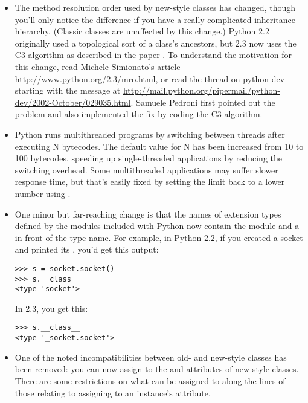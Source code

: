 \documentclass{howto}
\begin{document}
\begin{itemize}
\item The method resolution order used by new-style classes has
changed, though you'll only notice the difference if you have a really
complicated inheritance hierarchy.  (Classic classes are unaffected by
this change.)  Python 2.2 originally used a topological sort of a
class's ancestors, but 2.3 now uses the C3 algorithm as described in
the paper .
To understand the motivation for this change, 
read Michele Simionato's article 
      {http://www.python.org/2.3/mro.html}, or
read the thread on python-dev starting with the message at
\url{http://mail.python.org/pipermail/python-dev/2002-October/029035.html}.
Samuele Pedroni first pointed out the problem and also implemented the
fix by coding the C3 algorithm.

\item Python runs multithreaded programs by switching between threads
after executing N bytecodes.  The default value for N has been
increased from 10 to 100 bytecodes, speeding up single-threaded
applications by reducing the switching overhead.  Some multithreaded
applications may suffer slower response time, but that's easily fixed
by setting the limit back to a lower number using
.

\item One minor but far-reaching change is that the names of extension
types defined by the modules included with Python now contain the
module and a  in front of the type name.  For example, in
Python 2.2, if you created a socket and printed its
, you'd get this output:

\begin{verbatim}
>>> s = socket.socket()
>>> s.__class__
<type 'socket'>
\end{verbatim}

In 2.3, you get this:
\begin{verbatim}
>>> s.__class__
<type '_socket.socket'>
\end{verbatim}

\item One of the noted incompatibilities between old- and new-style
  classes has been removed: you can now assign to the
   and  attributes of new-style
  classes.  There are some restrictions on what can be assigned to
   along the lines of those relating to assigning to
  an instance's  attribute.

\end{itemize}
\end{document}
